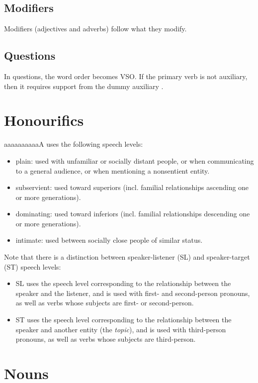 \documentclass{book}
\newcommand{\lname}{aaaaaaaaaaA}
\begin{document}
\section{Modifiers}

Modifiers (adjectives and adverbs) follow what they modify.

\section{Questions}

In questions, the word order becomes VSO. If the primary verb is not auxiliary, then it requires support from the dummy auxiliary .

\chapter{Honourifics}

\lname{} uses the following speech levels:

\begin{itemize}
  \item plain: used with unfamiliar or socially distant people, or when communicating to a general audience, or when mentioning a nonsentient entity.
  \item subservient: used toward superiors (incl. familial relationships ascending one or more generations).
  \item dominating: used toward inferiors (incl. familial relationships descending one or more generations).
  \item intimate: used between socially close people of similar status.
\end{itemize}

Note that there is a distinction between speaker-listener (SL) and speaker-target (ST) speech levels:

\begin{itemize}
  \item SL uses the speech level corresponding to the relationship between the speaker and the listener, and is used with first- and second-person pronouns, as well as verbs whose subjects are first- or second-person.
  \item ST uses the speech level corresponding to the relationship between the speaker and another entity (the \emph{topic}), and is used with third-person pronouns, as well as verbs whose subjects are third-person.
\end{itemize}

\chapter{Nouns}
\end{document}
